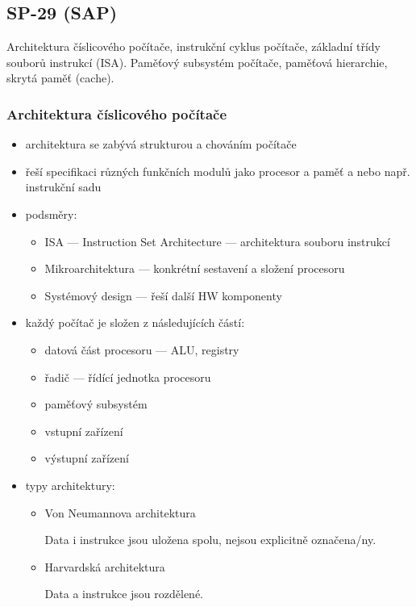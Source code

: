 \subsection{SP-29 (SAP)}
Architektura číslicového počítače, instrukční cyklus počítače, základní třídy souborů instrukcí (ISA). Paměťový subsystém počítače, paměťová hierarchie, skrytá paměť (cache).

\subsubsection*{Architektura číslicového počítače}

\begin{itemize}
	\item architektura se zabývá strukturou a chováním počítače
	
	\item řeší specifikaci různých funkčních modulů jako procesor a paměť a nebo např. instrukční sadu
	
	\item podsměry:
	\begin{itemize}
		\item ISA --- Instruction Set Architecture --- architektura souboru instrukcí
		\item Mikroarchitektura --- konkrétní sestavení a složení procesoru
		\item Systémový design --- řeší další HW komponenty
	\end{itemize}
	
	\item každý počítač je složen z následujících částí:
	\begin{itemize}
		\item datová část procesoru --- ALU, registry
		\item řadič --- řídící jednotka procesoru
		\item paměťový subsystém
		\item vstupní zařízení
		\item výstupní zařízení
	\end{itemize}
	
	\item typy architektury:
	\begin{itemize}
		\item Von Neumannova architektura
		
		Data i instrukce jsou uložena spolu, nejsou explicitně označena/ny.
		
		\item Harvardská architektura
		
		Data a instrukce jsou rozdělené.
	\end{itemize}
\end{itemize}

